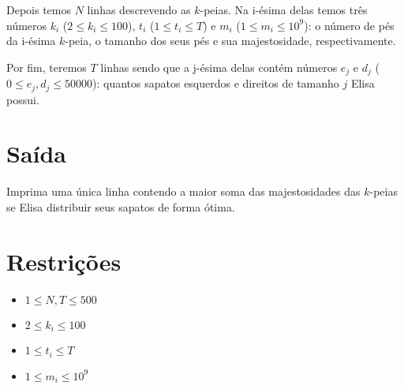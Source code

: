 Depois temos $N$ linhas descrevendo as $k$-peias. Na i-ésima delas temos três números $k_i$ ($2 \leq k_i \leq 100$), $t_i$ ($1 \leq t_i \leq T$) e $m_i$ ($1 \leq m_i \leq 10^9$): o número de pés da i-ésima $k$-peia, o tamanho dos seus pés e sua majestosidade, respectivamente. 

Por fim, teremos $T$ linhas sendo que a j-ésima delas contém números $e_j$ e $d_j$ ($0 \leq e_j, d_j \leq 50000$): quantos sapatos esquerdos e direitos de tamanho $j$ Elisa possui.

%
%


\section*{Saída}

Imprima uma única linha contendo a maior soma das majestosidades das $k$-peias se Elisa distribuir seus sapatos de forma ótima.

\section*{Restrições}

\begin{itemize}
\item $ 1 \leq N, T \leq 500$
\item $2 \leq k_i \leq 100$
\item $1 \leq t_i \leq T$
\item $1 \leq m_i \leq 10^9$
\end{itemize}


\exemplo
